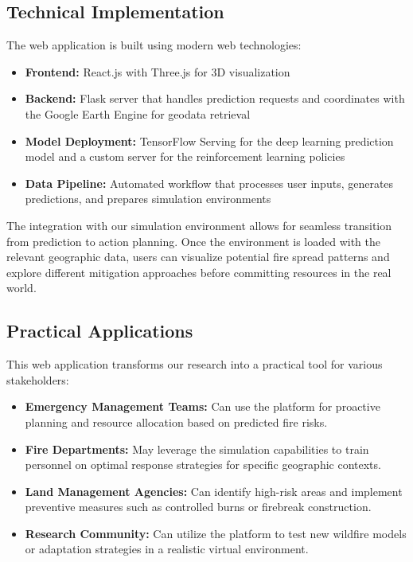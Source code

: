 \documentclass[conference]{IEEEtran}
\begin{document}
\subsection{Technical Implementation}
The web application is built using modern web technologies:

\begin{itemize}
    \item \textbf{Frontend:} React.js with Three.js for 3D visualization
    
    \item \textbf{Backend:} Flask server that handles prediction requests and coordinates with the Google Earth Engine for geodata retrieval
    
    \item \textbf{Model Deployment:} TensorFlow Serving for the deep learning prediction model and a custom server for the reinforcement learning policies
    
    \item \textbf{Data Pipeline:} Automated workflow that processes user inputs, generates predictions, and prepares simulation environments
\end{itemize}

\noindent
The integration with our simulation environment allows for seamless transition from prediction to action planning. Once the environment is loaded with the relevant geographic data, users can visualize potential fire spread patterns and explore different mitigation approaches before committing resources in the real world.

\subsection{Practical Applications}
This web application transforms our research into a practical tool for various stakeholders:

\begin{itemize}
    \item \textbf{Emergency Management Teams:} Can use the platform for proactive planning and resource allocation based on predicted fire risks.
    
    \item \textbf{Fire Departments:} May leverage the simulation capabilities to train personnel on optimal response strategies for specific geographic contexts.
    
    \item \textbf{Land Management Agencies:} Can identify high-risk areas and implement preventive measures such as controlled burns or firebreak construction.
    
    \item \textbf{Research Community:} Can utilize the platform to test new wildfire models or adaptation strategies in a realistic virtual environment.
\end{itemize}
\end{document}
